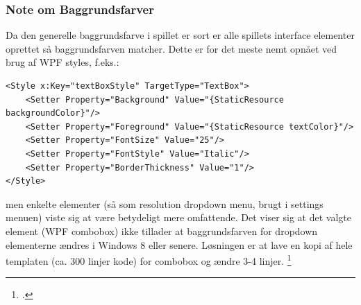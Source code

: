 \subsubsection{Note om Baggrundsfarver}
Da den generelle baggrundsfarve i spillet er sort er alle spillets interface elementer oprettet så baggrundsfarven matcher. Dette er for det meste nemt opnået ved brug af WPF styles, f.eks.:
\begin{lstlisting}
<Style x:Key="textBoxStyle" TargetType="TextBox">
    <Setter Property="Background" Value="{StaticResource backgroundColor}"/>
    <Setter Property="Foreground" Value="{StaticResource textColor}"/>
    <Setter Property="FontSize" Value="25"/>
    <Setter Property="FontStyle" Value="Italic"/>
    <Setter Property="BorderThickness" Value="1"/>
</Style>
\end{lstlisting}
men enkelte elementer (så som resolution dropdown menu, brugt i settings menuen) viste sig at være betydeligt mere omfattende. Det viser sig at det valgte element (WPF combobox) ikke tillader at baggrundsfarven for dropdown elementerne ændres i Windows 8 eller senere. Løsningen er at lave en kopi af hele templaten (ca. 300 linjer kode) for combobox og ændre 3-4 linjer. \footcite{https://social.technet.microsoft.com/wiki/contents/articles/24240.changing-the-background-color-of-a-combobox-in-wpf-on-windows-8.aspx}

\newpage
